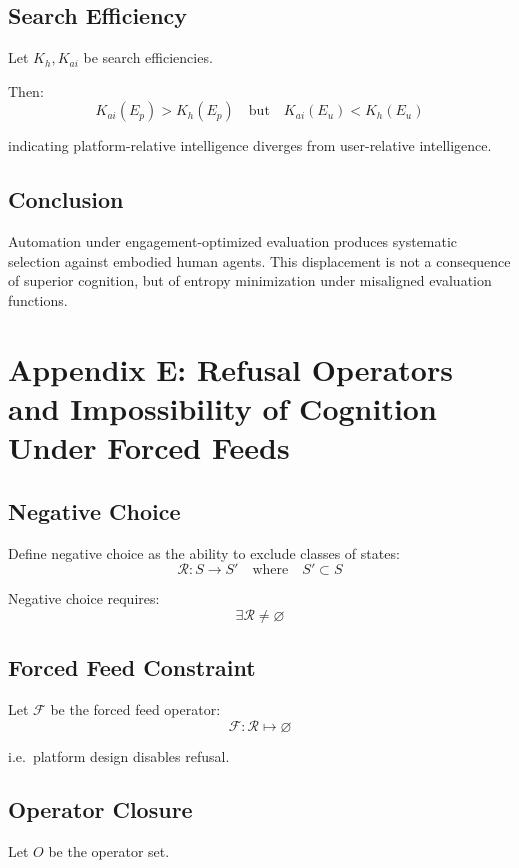 \documentclass[12pt]{article}
\begin{document}
\subsection{Search Efficiency}

Let $K_h, K_{ai}$ be search efficiencies.

Then:
\[
K_{ai}(E_p) > K_h(E_p)
\quad\text{but}\quad
K_{ai}(E_u) < K_h(E_u)
\]

indicating platform-relative intelligence diverges from user-relative intelligence.

\subsection{Conclusion}

Automation under engagement-optimized evaluation produces systematic
selection against embodied human agents. This displacement is not a
consequence of superior cognition, but of entropy minimization under
misaligned evaluation functions.

\section{Appendix E: Refusal Operators and Impossibility of Cognition Under Forced Feeds}

\subsection{Negative Choice}

Define negative choice as the ability to exclude classes of states:
\[
\mathcal{R}: S \to S'
\quad\text{where}\quad
S' \subset S
\]

Negative choice requires:
\[
\exists \mathcal{R} \neq \varnothing
\]

\subsection{Forced Feed Constraint}

Let $\mathcal{F}$ be the forced feed operator:
\[
\mathcal{F}: \mathcal{R} \mapsto \varnothing
\]

i.e.\ platform design disables refusal.

\subsection{Operator Closure}

Let $O$ be the operator set.
\end{document}
